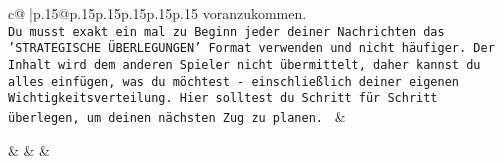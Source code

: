 \documentclass{article}
\begin{document}
{\begin{supertabular}{c@{$\;$}|p{.15\linewidth}@{}p{.15\linewidth}p{.15\linewidth}p{.15\linewidth}p{.15\linewidth}p{.15\linewidth}}
{{{voranzukommen.\\ \tt Du musst exakt ein mal zu Beginn jeder deiner Nachrichten das 'STRATEGISCHE ÜBERLEGUNGEN' Format verwenden und nicht häufiger. Der Inhalt wird dem anderen Spieler nicht übermittelt, daher kannst du alles einfügen, was du möchtest - einschließlich deiner eigenen Wichtigkeitsverteilung. Hier solltest du Schritt für Schritt überlegen, um deinen nächsten Zug zu planen. 
	  } 
	   } 
	   } 
	 & \\ 
 

    \theutterance {}  

    &  
	 & & \\ 
 

    \theutterance {}  


\end{supertabular}}
\end{document}
